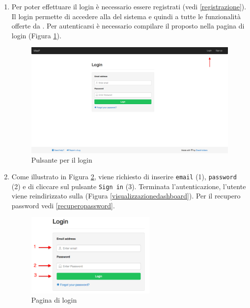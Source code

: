 		\begin{enumerate}
			
			\item Per poter effettuare il login è necessario essere registrati (vedi \ref{registrazione}). \\
			Il login permette di accedere alla  del sistema e quindi a tutte le funzionalità offerte da . Per autenticarsi è necessario compilare il  proposto nella pagina di login (Figura \ref{fig:loginButton}). 

			\begin{figure}[H]
				\centering \includegraphics[width=1\textwidth]{img/pulsanteLogin.png}
			\caption{ \label{fig:loginButton} Pulsante per il login}
			\end{figure}

			\item Come illustrato in Figura \ref{fig:login}, viene richiesto di inserire \texttt{email} (1), \texttt{password} (2) e di cliccare sul pulsante \texttt{Sign in} (3). Terminata l'autenticazione, l'utente viene reindirizzato sulla  (Figura \ref{visualizzazionedashboard}). Per il recupero password vedi \ref{recuperopassword}.

			\begin{figure}[H]
				\centering \includegraphics[width=0.6\textwidth]{img/login.png}
			\caption{ \label{fig:login} Pagina di login}
			\end{figure}

		\end{enumerate}

